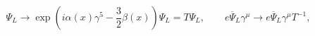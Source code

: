 \begin{equation}
\Psi_L \rightarrow \exp(i\alpha(x)\gamma^5
-\frac{3}{2}\beta(x))\Psi_L = T \Psi_L , \qquad
e{\overline\Psi}_L\gamma^\mu \rightarrow
e{\overline\Psi}_L\gamma^\mu T^{-1} ,
\end{equation}

